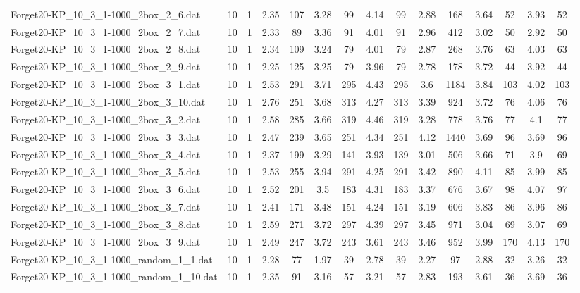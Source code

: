 \begin{table}[!ht]
{\begin{tabular}{lcccccccccccccc}
Forget20-KP\_10\_3\_1-1000\_2box\_2\_6.dat & 10 & 1 & 2.35 & 107 & 3.28 & 99 & 4.14 & 99 & 2.88 & 168 & 3.64 & 52 & 3.93 & 52 \\
Forget20-KP\_10\_3\_1-1000\_2box\_2\_7.dat & 10 & 1 & 2.33 & 89 & 3.36 & 91 & 4.01 & 91 & 2.96 & 412 & 3.02 & 50 & 2.92 & 50 \\
Forget20-KP\_10\_3\_1-1000\_2box\_2\_8.dat & 10 & 1 & 2.34 & 109 & 3.24 & 79 & 4.01 & 79 & 2.87 & 268 & 3.76 & 63 & 4.03 & 63 \\
Forget20-KP\_10\_3\_1-1000\_2box\_2\_9.dat & 10 & 1 & 2.25 & 125 & 3.25 & 79 & 3.96 & 79 & 2.78 & 178 & 3.72 & 44 & 3.92 & 44 \\
Forget20-KP\_10\_3\_1-1000\_2box\_3\_1.dat & 10 & 1 & 2.53 & 291 & 3.71 & 295 & 4.43 & 295 & 3.6 & 1184 & 3.84 & 103 & 4.02 & 103 \\
Forget20-KP\_10\_3\_1-1000\_2box\_3\_10.dat & 10 & 1 & 2.76 & 251 & 3.68 & 313 & 4.27 & 313 & 3.39 & 924 & 3.72 & 76 & 4.06 & 76 \\
Forget20-KP\_10\_3\_1-1000\_2box\_3\_2.dat & 10 & 1 & 2.58 & 285 & 3.66 & 319 & 4.46 & 319 & 3.28 & 778 & 3.76 & 77 & 4.1 & 77 \\
Forget20-KP\_10\_3\_1-1000\_2box\_3\_3.dat & 10 & 1 & 2.47 & 239 & 3.65 & 251 & 4.34 & 251 & 4.12 & 1440 & 3.69 & 96 & 3.69 & 96 \\
Forget20-KP\_10\_3\_1-1000\_2box\_3\_4.dat & 10 & 1 & 2.37 & 199 & 3.29 & 141 & 3.93 & 139 & 3.01 & 506 & 3.66 & 71 & 3.9 & 69 \\
Forget20-KP\_10\_3\_1-1000\_2box\_3\_5.dat & 10 & 1 & 2.53 & 255 & 3.94 & 291 & 4.25 & 291 & 3.42 & 890 & 4.11 & 85 & 3.99 & 85 \\
Forget20-KP\_10\_3\_1-1000\_2box\_3\_6.dat & 10 & 1 & 2.52 & 201 & 3.5 & 183 & 4.31 & 183 & 3.37 & 676 & 3.67 & 98 & 4.07 & 97 \\
Forget20-KP\_10\_3\_1-1000\_2box\_3\_7.dat & 10 & 1 & 2.41 & 171 & 3.48 & 151 & 4.24 & 151 & 3.19 & 606 & 3.83 & 86 & 3.96 & 86 \\
Forget20-KP\_10\_3\_1-1000\_2box\_3\_8.dat & 10 & 1 & 2.59 & 271 & 3.72 & 297 & 4.39 & 297 & 3.45 & 971 & 3.04 & 69 & 3.07 & 69 \\
Forget20-KP\_10\_3\_1-1000\_2box\_3\_9.dat & 10 & 1 & 2.49 & 247 & 3.72 & 243 & 3.61 & 243 & 3.46 & 952 & 3.99 & 170 & 4.13 & 170 \\
Forget20-KP\_10\_3\_1-1000\_random\_1\_1.dat & 10 & 1 & 2.28 & 77 & 1.97 & 39 & 2.78 & 39 & 2.27 & 97 & 2.88 & 32 & 3.26 & 32 \\
Forget20-KP\_10\_3\_1-1000\_random\_1\_10.dat & 10 & 1 & 2.35 & 91 & 3.16 & 57 & 3.21 & 57 & 2.83 & 193 & 3.61 & 36 & 3.69 & 36 \\

\end{tabular}}
\end{table}
